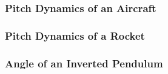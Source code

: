 \subsubsection{Pitch Dynamics of an Aircraft}

\subsubsection{Pitch Dynamics of a Rocket}

\subsubsection{Angle of an Inverted Pendulum}
